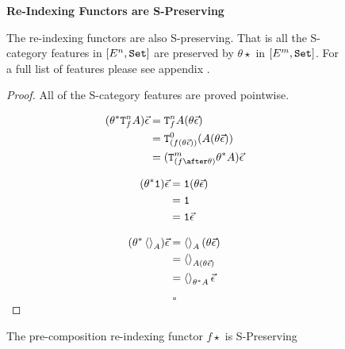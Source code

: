 \documentclass{Report}
\begin{document}
\begin{figure}
    
    \begin{framed}
        \centering
        \textbf{Re-Indexing Functors are S-Preserving}
                
        \begin{theorem}
            The re-indexing functors are also S-preserving. That is all the S-category features in $[E^n, \texttt{Set}]$ are preserved by $\theta\star$ in $[E^m, \texttt{Set}]$. For a full list of features please see appendix \needsRef.
        \end{theorem}
        
        
        \begin{proof}
            All of the S-category features are proved pointwise.
        
            \begin{align*}
                (\theta\star\Tn{f}{A})\ev & = \Tn{f}{A}(\theta\ev) \\
                & = \Tz{(f(\theta\ev))}{(A(\theta\ev))}\\
                & = (\Tm{(f\after\theta)}{\theta\star A})\ev\\
            \end{align*}
        
            
        \begin{align*}
            (\theta^* \texttt{1})\vec{\epsilon} & = \texttt{1}(\theta\vec{\epsilon})\\
            & = \texttt{1} \\
            & = \texttt{1} \vec{\epsilon}\\
        \end{align*}
        
        \begin{align*}
            (\theta^*\left\langle\right\rangle_{A})\vec{\epsilon} & = \left\langle\right\rangle_{A}(\theta\vec{\epsilon})\\
            & = \left\langle\right\rangle_{A(\theta\vec{\epsilon})}\\
            & = \left\langle\right\rangle_{\theta^* A}\vec{\epsilon}
        \end{align*}
        
            $$\square$$
        \end{proof}
    \end{framed}
    \caption{The pre-composition re-indexing functor $f\star$ is S-Preserving}
    \label{PrecompositionSClosure}
\end{figure}
\end{document}
